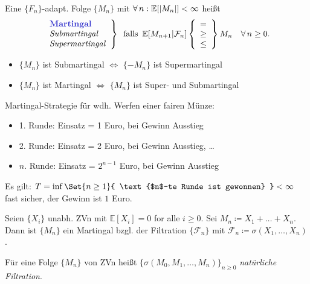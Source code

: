\documentclass{cheat-sheet}
\newcommand{\E}{\mathbb{E}} %
\newcommand{\Filt}{\mathcal{F}} %
\begin{document}
\begin{defn}
  Eine $\{ F_n \}$-adapt. Folge $\{ M_n \}$ mit $\fa{n\!}\! \E[\abs{M_n}] < \infty$ heißt
  \[
    \left. \begin{array}{l}
      \text{\emph{Martingal}}\\
      \text{\textit{Submartingal}}\\
      \text{\textit{Supermartingal}}\\
    \end{array} \right\}
    \enspace \text{falls} \enspace
    \E[M_{n+1} | \Filt_n]
    \left\{ \begin{array}{l}
      =\\
      \geq\\
      \leq
    \end{array} \right\}
    M_n
    \quad \forall\,n \geq 0.
  \]
\end{defn}

\begin{bem}
  \begin{itemize}
    \item $\{ M_n \}$ ist Submartingal $\iff$ $\{ -M_n \}$ ist Supermartingal
    \item $\{ M_n \}$ ist Martingal $\iff$ $\{ M_n \}$ ist Super- und Submartingal
  \end{itemize}
\end{bem}

\begin{bem}
  Martingal-Strategie für wdh. Werfen einer fairen Münze:
  \begin{itemize}
    \item 1. Runde: Einsatz = 1 Euro, bei Gewinn Ausstieg
    \item 2. Runde: Einsatz = 2 Euro, bei Gewinn Ausstieg, \ldots
    \item $n$. Runde: Einsatz = $2^{n-1}$ Euro, bei Gewinn Ausstieg
  \end{itemize}
  Es gilt: $T = \inf \Set{ n \geq 1 }{ \text{$n$-te Runde ist gewonnen} } < \infty$ fast sicher, der Gewinn ist $1$ Euro.
\end{bem}

\begin{bsp}
  Seien $\{ X_i \}$ unabh. ZVn mit $\E[X_i] = 0$ for alle $i \geq 0$.
  Sei $M_n \coloneqq X_1 + \ldots + X_n$.
  Dann ist $\{ M_n \}$ ein Martingal bzgl. der Filtration $\{ \Filt_n \}$ mit $\Filt_n \coloneqq \sigma(X_1, \ldots, X_n)$.
\end{bsp}

\begin{defn}
  Für eine Folge $\{ M_n \}$ von ZVn heißt $\{ \sigma(M_0, M_1, \ldots, M_n) \}_{n \geq 0}$ \emph{natürliche Filtration}.
\end{defn}
\end{document}
